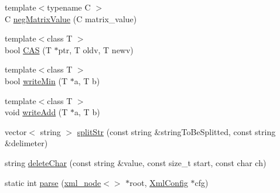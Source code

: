 \begin{DoxyCompactItemize}
\item 
{\footnotesize template$<$typename C $>$ }\\C \mbox{\hyperlink{namespacegraphsat_aced9a84b55f4f88b72bf2bce66e7e3bf}{neg\+Matrix\+Value}} (C matrix\+\_\+value)
\item 
{\footnotesize template$<$class T $>$ }\\bool \mbox{\hyperlink{namespacegraphsat_a6ba86c7b7b22c55dc8f404d1928ab71e}{C\+AS}} (T $\ast$ptr, T oldv, T newv)
\item 
{\footnotesize template$<$class T $>$ }\\bool \mbox{\hyperlink{namespacegraphsat_af93904918cd008fe84acebf0fec34ae3}{write\+Min}} (T $\ast$a, T b)
\item 
{\footnotesize template$<$class T $>$ }\\void \mbox{\hyperlink{namespacegraphsat_a179cb1f1b573c4d71f0f1ac8199f3262}{write\+Add}} (T $\ast$a, T b)
\item 
vector$<$ string $>$ \mbox{\hyperlink{namespacegraphsat_a767ef8183b8eada3700a18101d3444a8}{split\+Str}} (const string \&string\+To\+Be\+Splitted, const string \&delimeter)
\item 
string \mbox{\hyperlink{namespacegraphsat_aa2e41cce8a2ffcf08ed66f25228a21f3}{delete\+Char}} (const string \&value, const size\+\_\+t start, const char ch)
\item 
static int \mbox{\hyperlink{namespacegraphsat_a52f57679c1c2524761f4c398da1d9946}{parse}} (\mbox{\hyperlink{classrapidxml_1_1xml__node}{xml\+\_\+node}}$<$$>$ $\ast$root, \mbox{\hyperlink{classgraphsat_1_1_xml_config}{Xml\+Config}} $\ast$cfg)
\end{DoxyCompactItemize}
